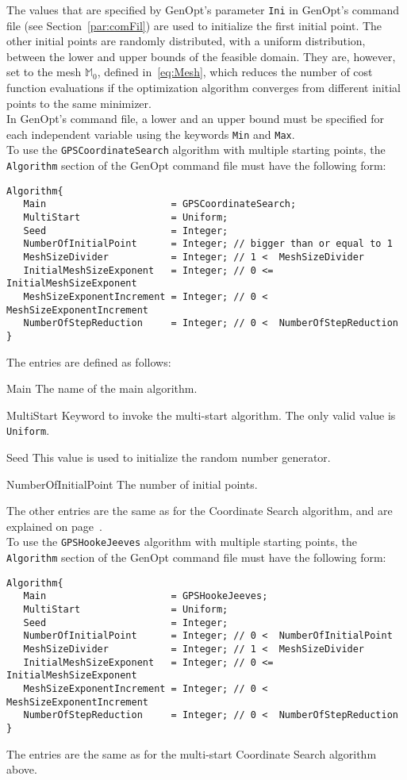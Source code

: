 The values that are specified
by GenOpt's parameter \texttt{Ini} in GenOpt's command file
(see Section~\ref{par:comFil}) are used to initialize
the first initial point.
The other initial points are randomly distributed, with
a uniform distribution,
between the lower
and upper bounds of the feasible domain. 
They are, however, set to the mesh $\mathbb M_0$, defined in~\eqref{eq:Mesh},
which reduces the number of cost function evaluations if
the optimization algorithm converges 
from different initial points to the same minimizer.\\

In GenOpt's command file, a lower and an upper bound must be specified
for each independent variable
using the keywords \texttt{Min} and \texttt{Max}.\\

To use the \texttt{GPSCoordinateSearch} algorithm with multiple
starting points,
the \texttt{Algorithm} section of the GenOpt command file 
must have the following form:
\begin{lstlisting}
Algorithm{
   Main                      = GPSCoordinateSearch;
   MultiStart                = Uniform;
   Seed                      = Integer;
   NumberOfInitialPoint      = Integer; // bigger than or equal to 1
   MeshSizeDivider           = Integer; // 1 <  MeshSizeDivider
   InitialMeshSizeExponent   = Integer; // 0 <= InitialMeshSizeExponent
   MeshSizeExponentIncrement = Integer; // 0 <  MeshSizeExponentIncrement
   NumberOfStepReduction     = Integer; // 0 <  NumberOfStepReduction
}
\end{lstlisting}
The entries are defined as follows:
\begin{codedescription}
\item [Main]
The name of the main algorithm.
\item [MultiStart]
Keyword to invoke the multi-start algorithm. 
The only valid value is \texttt{Uniform}.
\item [Seed]
This value is used to initialize the random number generator.
\item [NumberOfInitialPoint]
The number of initial points.
\end{codedescription}
The other entries are the same as for the Coordinate Search algorithm, 
and are explained on page~\pageref{sec:GPSCooSeaKeyWor}.\\

To use the \texttt{GPSHookeJeeves} algorithm with multiple
starting points,
the \texttt{Algorithm} section of the GenOpt command file 
must have the following form:
\begin{lstlisting}
Algorithm{
   Main                      = GPSHookeJeeves;
   MultiStart                = Uniform;
   Seed                      = Integer;
   NumberOfInitialPoint      = Integer; // 0 <  NumberOfInitialPoint
   MeshSizeDivider           = Integer; // 1 <  MeshSizeDivider
   InitialMeshSizeExponent   = Integer; // 0 <= InitialMeshSizeExponent
   MeshSizeExponentIncrement = Integer; // 0 <  MeshSizeExponentIncrement
   NumberOfStepReduction     = Integer; // 0 <  NumberOfStepReduction
}
\end{lstlisting}
The entries are the same as for the
multi-start Coordinate Search algorithm above.

